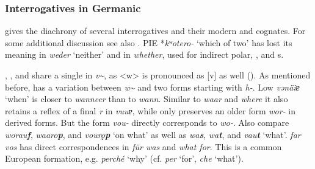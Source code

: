 \subsubsection{Interrogatives in Germanic}\label{sec:5.5.3.2}

 gives the diachrony of several  interrogatives and their modern  and  cognates. For some additional discussion see also \citet{Dunkel2014}. PIE *\textit{kʷ}\textit{otero-} ‘which of two’ has lost its  meaning in  \textit{weder} ‘neither’ and in  \textit{whether}, used for indirect polar, , and s.

, , and  share a single  in \textit{v{\textasciitilde}}, as  <w> is pronounced as [v] as well (). As mentioned before,  has a variation between \textit{w{\textasciitilde}} and two forms starting with \textit{h-}.  Low  \textit{vənäiɐ} ‘when’ is closer to  \textit{wanneer} than to  \textit{wann}. Similar to  \textit{waar} and  \textit{where} it also retains a reflex of a final \textit{r} in \textit{vuuɐ}, while  only preserves an older form \textit{wor-} in derived forms. But the form \textit{vou-} directly corresponds to  \textit{wo-}. Also compare  \textit{worau}\textbf{\textit{f}},  \textit{waaro}\textbf{\textit{p}}, and  \textit{vourǫ}\textbf{\textit{p}} ‘on what’ as well as  \textit{wa}\textbf{\textit{s}},  \textit{wa}\textbf{\textit{t}}, and  \textit{vau}\textbf{\textit{t}} ‘what’.  \textit{far vos} has direct correspondences in  \textit{für was} and  \textit{what for}. This is a common European formation, e.g.  \textit{perché} ‘why’ (cf. \textit{per} ‘for’, \textit{che} ‘what’).

